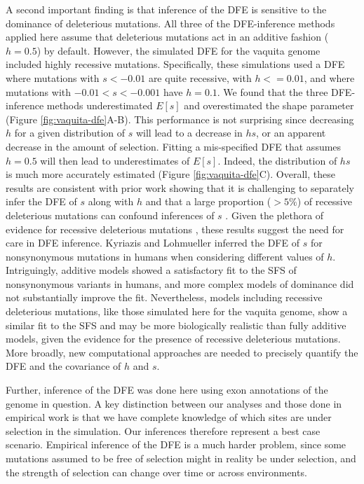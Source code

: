 \documentclass[hidelinks]{article}
\begin{document}
    A second important finding is that inference of the DFE
    is sensitive to the dominance of deleterious mutations.
    All three of the DFE-inference methods applied here assume that deleterious mutations act
    in an additive fashion ($h=0.5$) by default.
    However, the simulated DFE for the vaquita genome included highly recessive mutations.
    Specifically, these simulations used a DFE where mutations with $s<-0.01$ are quite recessive,
    with $h<=0.01$, and where mutations with $-0.01<s<-0.001$ have $h=0.1$.
    We found that the three DFE-inference methods underestimated $E[s]$ and overestimated the shape parameter (Figure \ref{fig:vaquita-dfe}A-B).
    This performance is not surprising since decreasing $h$ for a given distribution of $s$ will lead to a decrease in $hs$,
    or an apparent decrease in the amount of selection.
    Fitting a mis-specified DFE that assumes $h=0.5$ will then lead to underestimates of $E[s]$.
    Indeed, the distribution of $hs$ is much more accurately estimated (Figure \ref{fig:vaquita-dfe}C).
    Overall, these results are consistent with prior work showing that it is challenging to separately
    infer the DFE of $s$ along with $h$ \citep{veeramah2014evidence, kyriazis2024constraining, balick2022overcoming}
    and that a large proportion ($>5\%$) of recessive deleterious mutations can confound inferences of $s$ \citep{wade2023quantifying}.
    Given the plethora of evidence for recessive deleterious mutations
    \citep{mukai1972mutation, agrawal2011inferences, huber2018gene, di2024revisiting},
    these results suggest the need for care in DFE inference.
    Kyriazis and Lohmueller \citeyear{kyriazis2024constraining} inferred the DFE of $s$ for nonsynonymous mutations
    in humans when considering different values of $h$.
    Intriguingly, additive models showed a satisfactory fit to the SFS of nonsynonymous variants in humans,
    and more complex models of dominance did not substantially improve the fit.
    Nevertheless, models including recessive deleterious mutations, like those simulated here for the vaquita genome,
    show a similar fit to the SFS and may be more biologically realistic than fully additive models,
    given the evidence for the presence of recessive deleterious mutations.
    More broadly, new computational approaches are needed to precisely quantify the DFE and the covariance of $h$ and $s$.

    Further, inference of the DFE was done here using exon annotations of the genome in question.
    A key distinction between our analyses and those done in empirical work 
    is that we have complete knowledge of which sites are under selection in the simulation.
    Our inferences therefore represent a best case scenario. Empirical inference of the DFE is a much
    harder problem, since some mutations assumed to be free of selection
    might in reality be under selection, and the strength of selection can change over time or across environments.
\end{document}
